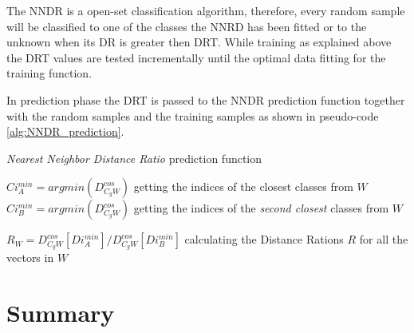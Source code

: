 The NNDR is a open-set classification algorithm, therefore, every random sample will be classified to one of the classes the NNRD has been fitted or to the unknown when its DR is greater then DRT. While training as explained above the DRT values are tested incrementally until the optimal data fitting for the training function.

In prediction phase the DRT is passed to the NNDR prediction function together with the random samples and the training samples as shown in pseudo-code \ref{alg:NNDR_prediction}.

\hfill

\begin{algorithm}[H]
\caption{\textit{Nearest Neighbor Distance Ratio} prediction function}\label{alg:NNDR_prediction}


$Ci^{min}_{A} = argmin(D^{cos}_{C_{g}W})$ getting the indices of the closest classes from $W$\;
$Ci^{min}_{B} = argmin(D^{cos}_{C_{g}W})$ getting the indices of the \textit{second closest} classes from $W$\;

$R_{W} = D^{cos}_{C_{g}W}[Di^{min}_{A}] / D^{cos}_{C_{g}W}[Di^{min}_{B}]$ calculating the Distance Rations $R$ for all the vectors in $W$


\end{algorithm}

\hfill

\section{Summary}\label{chap:openset:sec:NNRD_Description}

